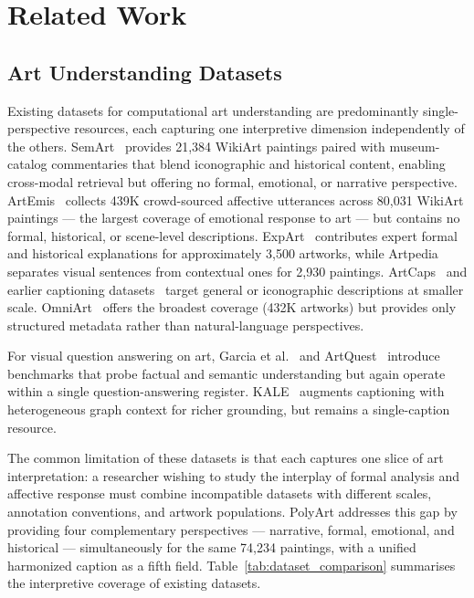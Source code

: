 
\section{Related Work}

\subsection{Art Understanding Datasets}

Existing datasets for computational art understanding are predominantly single-perspective resources, each capturing one interpretive dimension independently of the others.
SemArt~\cite{semart_2018} provides 21,384 WikiArt paintings paired with museum-catalog commentaries that blend iconographic and historical content, enabling cross-modal retrieval but offering no formal, emotional, or narrative perspective.
ArtEmis~\cite{achlioptas2021artemis} collects 439K crowd-sourced affective utterances across 80,031 WikiArt paintings — the largest coverage of emotional response to art — but contains no formal, historical, or scene-level descriptions.
ExpArt~\cite{ExpArt_acl2024} contributes expert formal and historical explanations for approximately 3,500 artworks, while Artpedia~\cite{2019_Artpedia} separates visual sentences from contextual ones for 2,930 paintings.
ArtCaps~\cite{ArtCaps} and earlier captioning datasets~\cite{MM_19_art, Iconographic_IC} target general or iconographic descriptions at smaller scale.
OmniArt~\cite{2017omniart} offers the broadest coverage (432K artworks) but provides only structured metadata rather than natural-language perspectives.

For visual question answering on art, Garcia et al.~\cite{garcia_dataset_2020} and ArtQuest~\cite{bleidt_artquest_2024} introduce benchmarks that probe factual and semantic understanding but again operate within a single question-answering register.
KALE~\cite{ijcai2024p848} augments captioning with heterogeneous graph context for richer grounding, but remains a single-caption resource.

The common limitation of these datasets is that each captures one slice of art interpretation: a researcher wishing to study the interplay of formal analysis and affective response must combine incompatible datasets with different scales, annotation conventions, and artwork populations.
PolyArt addresses this gap by providing four complementary perspectives — narrative, formal, emotional, and historical — simultaneously for the same 74,234 paintings, with a unified harmonized caption as a fifth field.
Table~\ref{tab:dataset_comparison} summarises the interpretive coverage of existing datasets.

